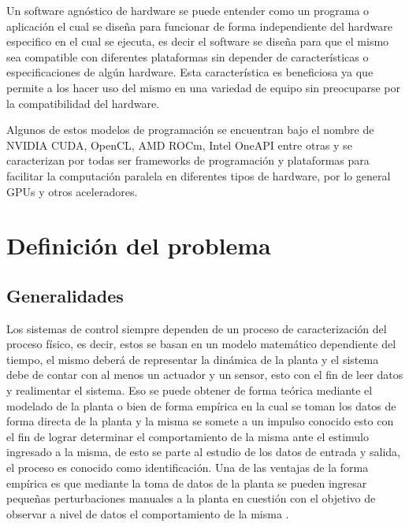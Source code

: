 \documentclass[12pt]{article}
\begin{document}
Un software agnóstico de hardware se puede entender como un programa o aplicación el cual se diseña para funcionar de forma independiente del hardware especifico en el cual se ejecuta, es decir el software se diseña para que el mismo sea compatible con diferentes plataformas sin depender de características o especificaciones de algún hardware. Esta característica es beneficiosa ya que permite a los  hacer uso del mismo en una variedad de equipo sin preocuparse por la compatibilidad del hardware\cite{nozal2021exploiting}.

Algunos de estos modelos de programación se encuentran bajo el nombre de NVIDIA CUDA, OpenCL, AMD ROCm, Intel OneAPI entre otras y se caracterizan por todas ser frameworks de programación y plataformas para facilitar la computación paralela en diferentes tipos de hardware, por lo general GPUs y otros aceleradores.
\newpage

\section{Definición del problema}

\subsection{Generalidades}

Los sistemas de control siempre dependen de un proceso de caracterización del proceso físico, es decir, estos se basan en un modelo matemático dependiente del tiempo, el mismo deberá de representar la dinámica de la planta  y el sistema debe de contar con al menos un actuador y un sensor, esto con el fin de leer datos y realimentar el sistema. Eso se puede obtener de forma teórica mediante el modelado de la planta o bien de forma empírica en la cual se toman los datos de forma directa de la planta y la misma se somete a un impulso conocido esto con el fin de lograr determinar el comportamiento de la misma ante el estimulo ingresado a la misma, de esto se parte al estudio de los datos de entrada y salida, el proceso es conocido como identificación. Una de las ventajas de la forma empírica es que mediante la toma de datos de la planta se pueden ingresar pequeñas perturbaciones manuales a la planta en cuestión con el objetivo de observar a nivel de datos el comportamiento de la misma \cite{15-tec}. 
\end{document}
